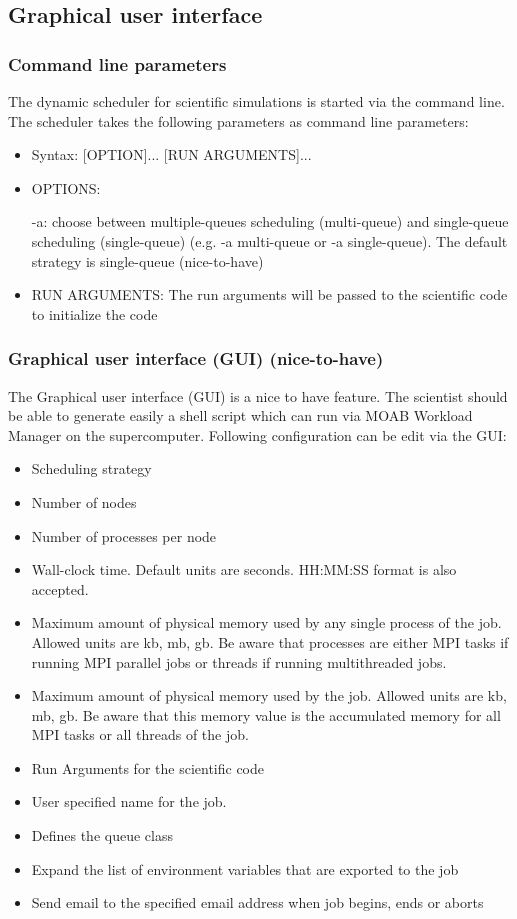 \subsection{Graphical user interface}
	\subsubsection{Command line parameters}
		The dynamic scheduler for scientific simulations is started via the command line. The scheduler takes the following parameters as command line parameters:
	
		\begin{itemize}	
			\item Syntax: [OPTION]... [RUN ARGUMENTS]...
				
			\item OPTIONS:
							
				\subitem -a: choose between multiple-queues scheduling (multi-queue) and single-queue scheduling (single-queue) (e.g. -a multi-queue or -a single-queue). The default strategy is single-queue (nice-to-have)
					
			\item RUN ARGUMENTS:
				\subitem The run arguments will be passed to the scientific code to initialize the code
		\end{itemize}
		
	\subsubsection{Graphical user interface (GUI) (nice-to-have)}
		The Graphical user interface (GUI) is a nice to have feature. The scientist should be able to generate easily a shell script which can run via MOAB Workload Manager on the supercomputer. Following configuration can be edit via the GUI:
		
		\begin{itemize}
			\item Scheduling strategy
			\item Number of nodes
			\item Number of processes per node
			\item Wall-clock time. Default units are seconds. 
			HH:MM:SS format is also accepted.
			\item Maximum amount of physical memory used by any single process of the job. Allowed units are kb, mb, gb. Be aware that processes are either MPI tasks if running MPI parallel jobs or threads if running multithreaded jobs.
			\item Maximum amount of physical memory used by the job.
			Allowed units are kb, mb, gb. Be aware that this memory value is the accumulated memory for all MPI tasks or all threads of the job.
			\item Run Arguments for the scientific code
			\item User specified name for the job.
			\item Defines the queue class
			\item Expand the list of environment variables that are exported to the job
			\item Send email to the specified email address when job begins, ends or aborts
		\end{itemize}
	
	